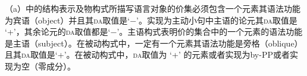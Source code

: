 （a）中的结构表示及物构式所描写语言对象的价集必须包含一个元素其语法功能为宾语（object）并且其\textsc{da}取值是`$-$'。实现为主动小句中主语的论元其\textsc{da}取值是 `+'，其余论元的\textsc{da}取值都是`$-$'。主语构式表明价的集合中的一个元素的语法功能是主语（subject）。在被动构式中，一定有一个元素其语法功能是旁格（oblique）且其\textsc{da}取值是`+'。在被动构式中，\textsc{da}取值为 `+' 的元素或者实现为by-PP或者实现为空（零成分）。

